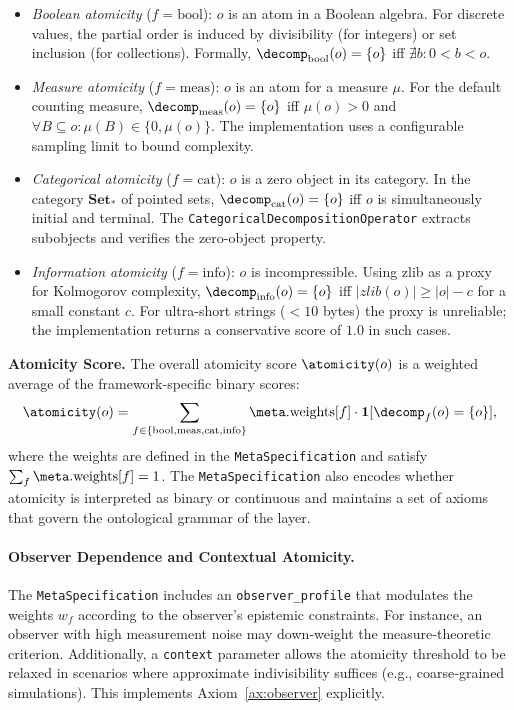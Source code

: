 \begin{itemize}
    \item \textit{Boolean atomicity} ($f=\text{bool}$): $o$ is an atom in a Boolean algebra. For discrete values, the partial order is induced by divisibility (for integers) or set inclusion (for collections). Formally, $\decomp_{\text{bool}}(o) = \{o\}$ iff $\nexists b: 0 < b < o$.
    \item \textit{Measure atomicity} ($f=\text{meas}$): $o$ is an atom for a measure $\mu$. For the default counting measure, $\decomp_{\text{meas}}(o) = \{o\}$ iff $\mu(o) > 0$ and $\forall B \subseteq o: \mu(B) \in \{0, \mu(o)\}$. The implementation uses a configurable sampling limit to bound complexity.
    \item \textit{Categorical atomicity} ($f=\text{cat}$): $o$ is a zero object in its category. In the category $\mathbf{Set}_*$ of pointed sets, $\decomp_{\text{cat}}(o) = \{o\}$ iff $o$ is simultaneously initial and terminal. The \texttt{CategoricalDecompositionOperator} extracts subobjects and verifies the zero-object property.
    \item \textit{Information atomicity} ($f=\text{info}$): $o$ is incompressible. Using zlib as a proxy for Kolmogorov complexity, $\decomp_{\text{info}}(o) = \{o\}$ iff $|zlib(o)| \ge |o| - c$ for a small constant $c$. For ultra-short strings ($<10$ bytes) the proxy is unreliable; the implementation returns a conservative score of $1.0$ in such cases.
\end{itemize}

\textbf{Atomicity Score.} The overall atomicity score $\atomicity(o)$ is a weighted average of the framework-specific binary scores:
\[
\atomicity(o) = \sum_{f \in \{\text{bool}, \text{meas}, \text{cat}, \text{info}\}} \meta.\text{weights}[f] \cdot \mathbf{1}[\decomp_f(o) = \{o\}],
\]
where the weights are defined in the \texttt{MetaSpecification} and satisfy $\sum_f \meta.\text{weights}[f] = 1$. The \texttt{MetaSpecification} also encodes whether atomicity is interpreted as binary or continuous and maintains a set of axioms that govern the ontological grammar of the layer.

\paragraph{Observer Dependence and Contextual Atomicity.}
The \texttt{MetaSpecification} includes an \texttt{observer\_profile} that modulates the weights $w_f$ according to the observer's epistemic constraints. For instance, an observer with high measurement noise may down‑weight the measure‑theoretic criterion. Additionally, a \texttt{context} parameter allows the atomicity threshold to be relaxed in scenarios where approximate indivisibility suffices (e.g., coarse‑grained simulations). This implements Axiom~\ref{ax:observer} explicitly.

